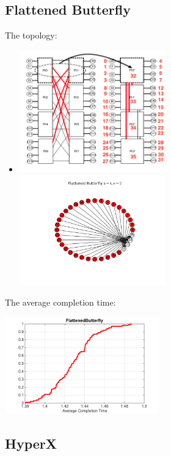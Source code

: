 \documentclass[11pt]{article}
\begin{document}
\subsection{Flattened Butterfly}
The topology: \\
\begin{itemize}
	\item \centerline{}
	\includegraphics[width=0.5\textwidth]{figure/draw/FlattenedButterfly_original.png}
	\includegraphics[width=0.5\textwidth]{figure/draw/FlattenedButterfly.png}
	
\end{itemize}
The average completion time: \\
\centerline{\includegraphics[width=0.5\textwidth]{figure/picture/FlatenedButterfly}}


\subsection{HyperX}
\end{document}
